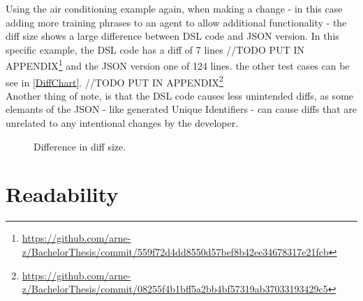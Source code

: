 Using the air conditioning example again, when making a change - in this case adding more training phrases to an agent to allow additional functionality - the diff size shows a large difference between DSL code and JSON version. In this specific example, the DSL code has a diff of 7 lines //TODO PUT IN APPENDIX\footnote{\url{https://github.com/arne-z/BachelorThesis/commit/559f72d4dd8550d57bef8b42ee34678317e21fcb}} and the JSON version one of 124 lines. the other test cases can be see in \autoref{DiffChart}.
//TODO PUT IN APPENDIX\footnote{\url{https://github.com/arne-z/BachelorThesis/commit/08255f4b1bff5a2bb4bf57319ab37033193429c5}}\\
Another thing of note, is that the DSL code causes less unintended diffs, as some elemants of the JSON - like generated Unique Identifiers - can cause diffs that are unrelated to any intentional changes by the developer.


\begin{figure}
    \centering
    
    \caption{Difference in diff size.}
    \label{DiffChart}
    
\end{figure}

\section{Readability}

